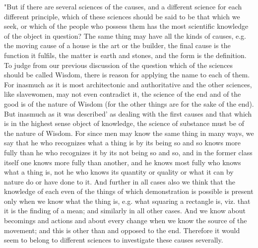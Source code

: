 "But if there are several sciences of the causes, and a different
science for each different principle, which of these sciences should
be said to be that which we seek, or which of the people who possess
them has the most scientific knowledge of the object in question?
The same thing may have all the kinds of causes, e.g. the moving cause
of a house is the art or the builder, the final cause is the function
it fulfils, the matter is earth and stones, and the form is the definition.
To judge from our previous discussion of the question which of the
sciences should be called Wisdom, there is reason for applying the
name to each of them. For inasmuch as it is most architectonic and
authoritative and the other sciences, like slavewomen, may not even
contradict it, the science of the end and of the good is of the nature
of Wisdom (for the other things are for the sake of the end). But
inasmuch as it was described' as dealing with the first causes and
that which is in the highest sense object of knowledge, the science
of substance must be of the nature of Wisdom. For since men may know
the same thing in many ways, we say that he who recognizes what a
thing is by its being so and so knows more fully than he who recognizes
it by its not being so and so, and in the former class itself one
knows more fully than another, and he knows most fully who knows what
a thing is, not he who knows its quantity or quality or what it can
by nature do or have done to it. And further in all cases also we
think that the knowledge of each even of the things of which demonstration
is possible is present only when we know what the thing is, e.g. what
squaring a rectangle is, viz. that it is the finding of a mean; and
similarly in all other cases. And we know about becomings and actions
and about every change when we know the source of the movement; and
this is other than and opposed to the end. Therefore it would seem
to belong to different sciences to investigate these causes severally.

